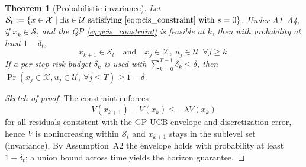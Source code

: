 \documentclass[10pt,a4paper]{amsart}
\newtheorem{theorem}{Theorem}
\newcommand{\PCIS}{\mathcal{S}}   %
\newcommand{\Uset}{\mathcal{U}}
\newcommand{\Vdec}{\lambda}       %
\newcommand{\Xset}{\mathcal{X}}
\begin{document}
\begin{theorem}[Probabilistic invariance]\label{thm:pcis}
Let $\PCIS_t := \{x\in\Xset \mid \exists u\in\Uset \text{ satisfying } \eqref{eq:pcis_constraint} \text{ with } s=0 \}$. 
Under A1–A4, if $x_k\in\PCIS_t$ and the QP \eqref{eq:pcis_constraint} is feasible at $k$, then with probability at least $1-\delta_t$,
\[
x_{k+1}\in\PCIS_t\quad \text{and}\quad x_j\in\Xset,\ u_j\in\Uset\ \ \forall j\ge k.
\]
If a per-step risk budget $\delta_k$ is used with $\sum_{k=0}^{T-1}\delta_k\le \delta$, then
$\Pr(x_j\in \Xset, u_j\in\Uset,\ \forall j\le T) \ge 1-\delta$.
\end{theorem}

\begin{proof}[Sketch of proof]
The constraint enforces
\begin{equation}
V(x_{k+1})-V(x_k)\le -\Vdec V(x_k) \end{equation} for all residuals consistent with the GP-UCB envelope and discretization error, hence $V$ is nonincreasing within $\PCIS_t$ and $x_{k+1}$ stays in the sublevel set (invariance). By Assumption~A2 the envelope holds with probability at least \(1-\delta_t\); a union bound across time
yields the horizon guarantee. \qedhere
\end{proof}
\end{document}
